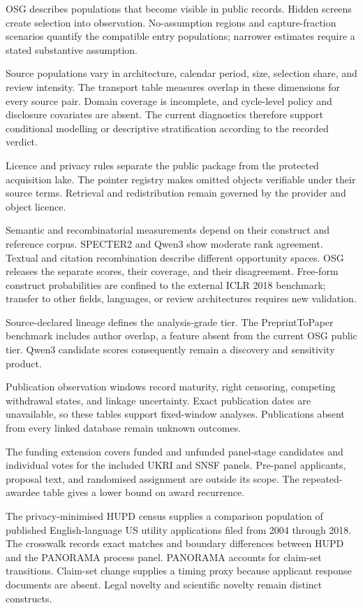 \documentclass[
  10pt,
]{article}
\begin{document}
OSG describes populations that become visible in public records. Hidden
screens create selection into observation. No-assumption regions and
capture-fraction scenarios quantify the compatible entry populations;
narrower estimates require a stated substantive assumption.

Source populations vary in architecture, calendar period, size,
selection share, and review intensity. The transport table measures
overlap in these dimensions for every source pair. Domain coverage is
incomplete, and cycle-level policy and disclosure covariates are absent.
The current diagnostics therefore support conditional modelling or
descriptive stratification according to the recorded verdict.

Licence and privacy rules separate the public package from the protected
acquisition lake. The pointer registry makes
\OSGClaimPointerRebuildArtifacts{} omitted objects verifiable under
their source terms. Retrieval and redistribution remain governed by the
provider and object licence.

Semantic and recombinatorial measurements depend on their construct and
reference corpus. SPECTER2 and Qwen3 show moderate rank agreement.
Textual and citation recombination describe different opportunity
spaces. OSG releases the separate scores, their coverage, and their
disagreement. Free-form construct probabilities are confined to the
external ICLR 2018 benchmark; transfer to other fields, languages, or
review architectures requires new validation.

Source-declared lineage defines the analysis-grade tier. The
PreprintToPaper benchmark includes author overlap, a feature absent from
the current OSG public tier. Qwen3 candidate scores consequently remain
a discovery and sensitivity product.

Publication observation windows record maturity, right censoring,
competing withdrawal states, and linkage uncertainty. Exact publication
dates are unavailable, so these tables support fixed-window analyses.
Publications absent from every linked database remain unknown outcomes.

The funding extension covers funded and unfunded panel-stage candidates
and individual votes for the included UKRI and SNSF panels. Pre-panel
applicants, proposal text, and randomised assignment are outside its
scope. The repeated-awardee table gives a lower bound on award
recurrence.

The privacy-minimised HUPD census supplies a comparison population of
\OSGClaimHupdPublicApplications{} published English-language US utility
applications filed from 2004 through 2018. The crosswalk records exact
matches and boundary differences between HUPD and the PANORAMA process
panel. PANORAMA accounts for claim-set transitions. Claim-set change
supplies a timing proxy because applicant response documents are absent.
Legal novelty and scientific novelty remain distinct constructs.
\end{document}

